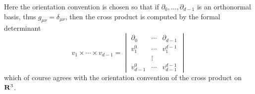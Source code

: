 Here the orientation convention is chosen so that if $\partial_0, \dots, \partial_{d - 1}$ is an orthonormal basis, thus $g_{\mu\nu} = \delta_{\mu\nu}$, then the cross product is computed by the formal determinant
\begin{equation}\label{formal determinant}
v_1 \times \cdots \times v_{d - 1} = \begin{vmatrix}\partial_0 & \cdots & \partial_{d - 1} \\
v_1^0 & \cdots & v_1^{d - 1}\\
& \vdots \\
v_{d - 1}^0 & \cdots & v_{d - 1}^{d - 1}\end{vmatrix}
\end{equation}
which of course agrees with the orientation convention of the cross product on $\mathbf{R}^3$.

